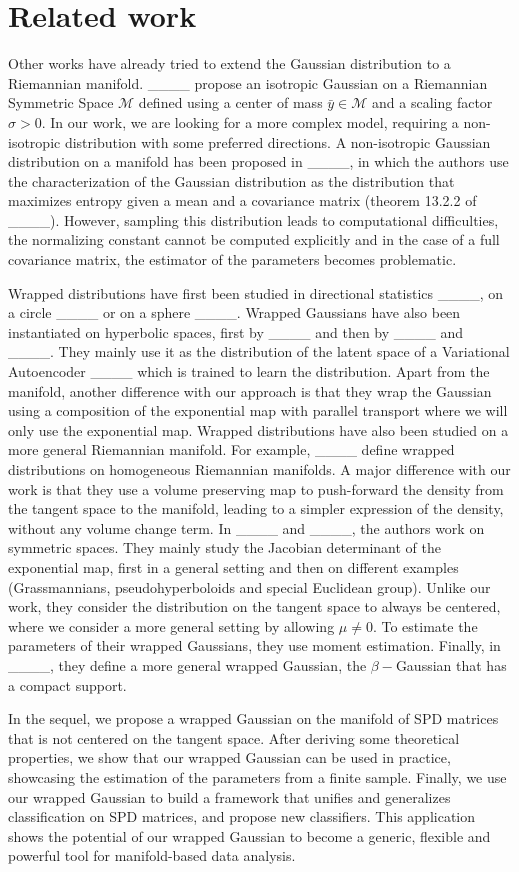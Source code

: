 \section{Related work}
Other works have already tried to extend the Gaussian distribution to a Riemannian manifold. ____ propose an isotropic Gaussian on a Riemannian Symmetric Space $\mathcal{M}$ defined using a center of mass $\bar{y} \in \mathcal{M}$ and a scaling factor $\sigma > 0$. 
In our work, we are looking for a more complex model, requiring a non-isotropic distribution with some preferred directions.  
A non-isotropic Gaussian distribution on a manifold has been proposed in ____, in which the authors use the characterization of the Gaussian distribution as the distribution that maximizes entropy given a mean and a covariance matrix (theorem 13.2.2 of ____). However, sampling this distribution leads to computational difficulties, the normalizing constant cannot be computed explicitly and in the case of a full covariance matrix, the estimator of the parameters becomes problematic.  

Wrapped distributions have first been studied in directional statistics ____, on a circle ____ or on a sphere ____. Wrapped Gaussians have also been instantiated on hyperbolic spaces, first by ____ and then by ____ and ____. They mainly use it as the distribution of the latent space of a Variational Autoencoder ____ which is trained to learn the distribution. Apart from the manifold, another difference with our approach is that they wrap the Gaussian using a composition of the exponential map with parallel transport where we will only use the exponential map.
Wrapped distributions have also been studied on a more general Riemannian manifold. For example, ____ define wrapped distributions on homogeneous Riemannian manifolds. A major difference with our work is that they use a volume preserving map to push-forward the density from the tangent space to the manifold, leading to a simpler expression of the density, without any volume change term. In ____ and ____, the authors work on symmetric spaces. They mainly study the Jacobian determinant of the exponential map, first in a general setting and then on different examples (Grassmannians, pseudohyperboloids and special Euclidean group). Unlike our work, they consider the distribution on the tangent space to always be centered, where we consider a more general setting by allowing $\mu \neq 0$. To estimate the parameters of their wrapped Gaussians, they use moment estimation.
Finally, in ____, they define a more general wrapped Gaussian, the $\beta-$Gaussian that has a compact support. %

In the sequel, we propose a  wrapped Gaussian on the manifold of SPD matrices that is not centered on the tangent space. After deriving some theoretical properties, we show that our wrapped Gaussian can be used in practice, showcasing the estimation of the parameters from a finite sample. Finally, we use our wrapped Gaussian to build a framework that unifies and generalizes classification on SPD matrices, and propose new classifiers. This application shows the potential of our wrapped Gaussian to become a generic, flexible and powerful tool for manifold-based data analysis.
